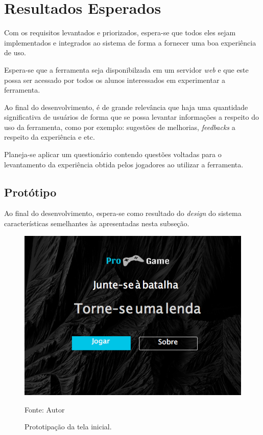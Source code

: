 \chapter{Resultados Esperados}
Com os requisitos levantados e priorizados, espera-se que todos eles sejam implementados e integrados ao sistema de forma a fornecer uma boa experiência
de uso. 

Espera-se que a ferramenta seja disponibilzada em um servidor \textit{web} e que este possa ser acessado por todos os alunos interessados em experimentar
a ferramenta.

Ao final do desenvolvimento, é de grande relevância que haja uma quantidade significativa de usuários de forma que se possa levantar informações a respeito
do uso da ferramenta, como por exemplo: sugestões de melhorias, \textit{feedbacks} a respeito da experiência e etc.

Planeja-se aplicar um questionário contendo questões voltadas para o levantamento da experiência obtida pelos jogadores ao utilizar a ferramenta.


\section{Protótipo}
Ao final do desenvolvimento, espera-se como resultado do \textit{design} do sistema características semelhantes às apresentadas nesta subseção. 


\begin{figure}[h]
	\centering
	\includegraphics[keepaspectratio=true,scale=0.8]{figuras/telainicial.png}
	\caption{Prototipação da tela inicial.}
	Fonte: {Autor}
	\label{telainicial}
\end{figure}	


